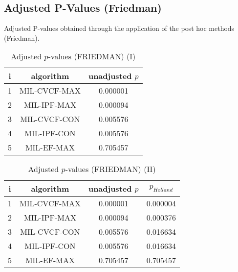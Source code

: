 \documentclass[a4paper,10pt]{article}
\begin{document}
\begin{landscape}
\newpage

\section{Adjusted P-Values (Friedman)}


Adjusted P-values obtained through the application of the post hoc methods (Friedman).

\begin{table}[!htp]
\centering\small
\begin{tabular}{ccc}
i&algorithm&unadjusted $p$\\
\hline1&MIL-CVCF-MAX&0.000001\\2&MIL-IPF-MAX&0.000094\\3&MIL-CVCF-CON&0.005576\\4&MIL-IPF-CON&0.005576\\5&MIL-EF-MAX&0.705457\\\hline
\end{tabular}
\caption{Adjusted $p$-values (FRIEDMAN) (I)}
\end{table}
\begin{table}[!htp]
\centering\small
\begin{tabular}{cccc}
i&algorithm&unadjusted $p$&$p_{Holland}$\\
\hline1&MIL-CVCF-MAX&0.000001&0.000004\\2&MIL-IPF-MAX&0.000094&0.000376\\3&MIL-CVCF-CON&0.005576&0.016634\\4&MIL-IPF-CON&0.005576&0.016634\\5&MIL-EF-MAX&0.705457&0.705457\\\hline
\end{tabular}
\caption{Adjusted $p$-values (FRIEDMAN) (II)}
\end{table}

\newpage
\end{landscape}
\end{document}
